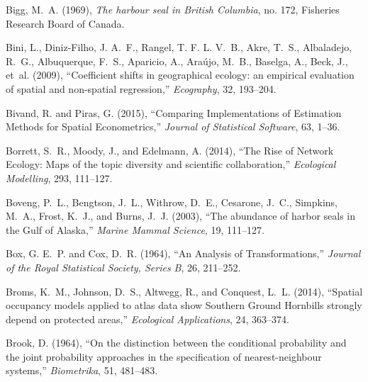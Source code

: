 \documentclass[11pt, titlepage]{article}\usepackage[]{graphicx}\usepackage[]{color}
\begin{document}
\begin{spacing}{1.9}
\begin{flushleft}
\begin{thebibliography}{126}
Bigg, M.~A. (1969), \textit{The harbour seal in British Columbia}, no. 172,
  Fisheries Research Board of Canada.

Bini, L., Diniz-Filho, J. A.~F., Rangel, T. F. L. V.~B., Akre, T.~S.,
  Albaladejo, R.~G., Albuquerque, F.~S., Aparicio, A., Ara{\'u}jo, M.~B.,
  Baselga, A., Beck, J., et~al. (2009), \enquote{Coefficient shifts in
  geographical ecology: an empirical evaluation of spatial and non-spatial
  regression,} \textit{Ecography}, 32, 193--204.

Bivand, R. and Piras, G. (2015), \enquote{Comparing Implementations of
  Estimation Methods for Spatial Econometrics,} \textit{Journal of Statistical
  Software}, 63, 1--36.

Borrett, S.~R., Moody, J., and Edelmann, A. (2014), \enquote{The Rise of
  Network Ecology: Maps of the topic diversity and scientific collaboration,}
  \textit{Ecological Modelling}, 293, 111--127.

Boveng, P.~L., Bengtson, J.~L., Withrow, D.~E., Cesarone, J.~C., Simpkins,
  M.~A., Frost, K.~J., and Burns, J.~J. (2003), \enquote{The abundance of
  harbor seals in the {G}ulf of {A}laska,} \textit{Marine Mammal Science}, 19,
  111--127.

Box, G. E.~P. and Cox, D.~R. (1964), \enquote{An Analysis of Transformations,}
  \textit{Journal of the Royal Statistical Society, Series B}, 26, 211--252.

Broms, K.~M., Johnson, D.~S., Altwegg, R., and Conquest, L.~L. (2014),
  \enquote{Spatial occupancy models applied to atlas data show Southern Ground
  Hornbills strongly depend on protected areas,} \textit{Ecological
  Applications}, 24, 363--374.

Brook, D. (1964), \enquote{On the distinction between the conditional
  probability and the joint probability approaches in the specification of
  nearest-neighbour systems,} \textit{Biometrika}, 51, 481--483.


\end{thebibliography}
\end{flushleft}
\end{spacing}
\end{document}
